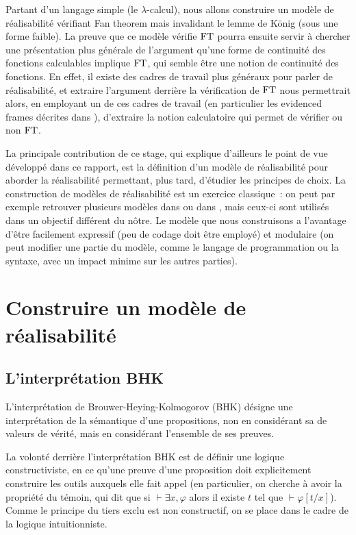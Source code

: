 \documentclass{article}
\begin{document}
Partant d'un langage simple (le $\lambda$-calcul), nous allons construire un modèle de réalisabilité vérifiant Fan theorem mais invalidant le lemme de König (sous une forme faible). La preuve que ce modèle vérifie $\mathrm{FT}$ pourra ensuite servir à chercher une présentation plus générale de l'argument qu'une forme de continuité des fonctions calculables implique $\mathrm{FT}$, qui semble être une notion de continuité des fonctions. En effet, il existe des cadres de travail plus généraux pour parler de réalisabilité, et extraire l'argument derrière la vérification de $\mathrm{FT}$ nous permettrait alors, en employant un de ces cadres de travail (en particulier les evidenced frames décrites dans \cite{DBLP:conf/lics/0001MT21}), d'extraire la notion calculatoire qui permet de vérifier ou non $\mathrm{FT}$.

La principale contribution de ce stage, qui explique d'ailleurs le point de vue développé dans ce rapport, est la définition d'un modèle de réalisabilité pour aborder la réalisabilité permettant, plus tard, d'étudier les principes de choix. La construction de modèles de réalisabilité est un exercice classique~: on peut par exemple retrouver plusieurs modèles dans \cite{Dinis_2023} ou dans \cite{COHEN201987}, mais ceux-ci sont utilisés dans un objectif différent du nôtre. Le modèle que nous construisons a l'avantage d'être facilement expressif (peu de codage doit être employé) et modulaire (on peut modifier une partie du modèle, comme le langage de programmation ou la syntaxe, avec un impact minime sur les autres parties).

\section{Construire un modèle de réalisabilité}

\subsection{L'interprétation BHK}

L'interprétation de Brouwer-Heying-Kolmogorov (BHK) désigne une interprétation de la sémantique d'une propositions, non en considérant sa de valeurs de vérité, mais en considérant l'ensemble de ses preuves.

La volonté derrière l'interprétation BHK est de définir une logique constructiviste, en ce qu'une preuve d'une proposition doit explicitement construire les outils auxquels elle fait appel (en particulier, on cherche à avoir la propriété du témoin, qui dit que si $\vdash \exists x, \varphi$ alors il existe $t$ tel que $\vdash \varphi[t/x]$). Comme le principe du tiers exclu est non constructif, on se place dans le cadre de la logique intuitionniste.
\end{document}
